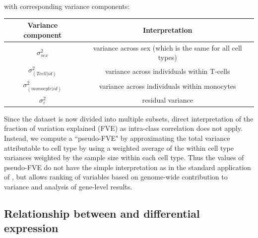 \documentclass[12pt]{article}\usepackage[]{graphicx}\usepackage[]{xcolor}
\begin{document}
with corresponding variance components:
\begin{center}
  \begin{tabular}{cc}
    \hline
    Variance component & Interpretation \\
    \hline
    $\sigma^2_{sex}$ & variance across sex (which is the same for all cell types)\\
    $\sigma^2_{(Tcell| id)}$ & variance across individuals within T-cells \\
    $\sigma^2_{(monocyte| id)}$ & variance across individuals within monocytes \\
    $\sigma^2_\varepsilon$ & residual variance \\   
    \hline
  \end{tabular}
\end{center} 

Since the dataset is now divided into multiple subsets, direct interpretation of the fraction of variation explained (FVE) as intra-class correlation does not apply.  Instead, we compute a ``pseudo-FVE" by approximating the total variance attributable to cell type by using a weighted average of the within cell type variances weighted by the sample size within each cell type.  Thus the values of pseudo-FVE do not have the simple interpretation as in the standard application of , but allows ranking of variables based on genome-wide contribution to variance and analysis of gene-level results.


\subsection{Relationship between  and differential expression}
\end{document}
